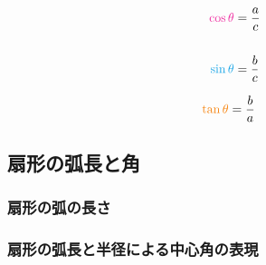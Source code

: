 \documentclass[../../imaging-math]{subfiles}
\begin{document}
\begin{figure}[h]
\begin{minipage}{0.49\columnwidth}
  \end{minipage}
  \begin{minipage}{0.22\columnwidth}
    \centering
    \Large
    \begin{align*}
      \color{Rhodamine}
      \cos \theta & = \dfrac{a}{c} \\\\
      \color{Cerulean}
      \sin \theta & = \dfrac{b}{c}
    \end{align*}
  \end{minipage}
  \begin{minipage}{0.22\columnwidth}
    \centering
    \Large
    \begin{align*}
      \color{BurntOrange}
      \tan \theta & = \dfrac{b}{a}
    \end{align*}
  \end{minipage}
\end{figure}

\subsection{扇形の弧長と角}

\subsubsection{扇形の弧の長さ}

\subsubsection{扇形の弧長と半径による中心角の表現}
\end{document}

